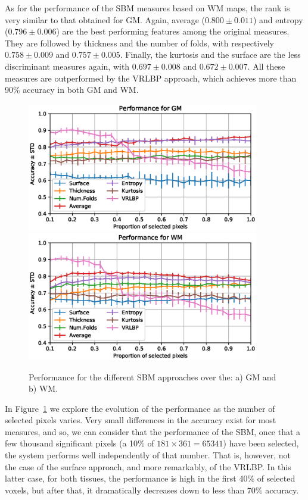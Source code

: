 As for the performance of the \ac{SBM} measures based on \ac{WM} maps, the rank is very similar to that obtained for \ac{GM}. Again, average ($0.800 \pm 0.011$) and entropy ($0.796 \pm 0.006$) are the best performing features among the original measures. They are followed by thickness and the number of folds, with respectively $0.758 \pm 0.009$ and $0.757 \pm 0.005$. Finally, the kurtosis and the surface are the less discriminant measures again, with $0.697 \pm 0.008$ and $0.672 \pm 0.007$. All these measures are outperformed by the \ac{VRLBP} approach, which achieves more than 90\% accuracy in both \ac{GM} and \ac{WM}. 

\begin{figure}[htp]
	\centering
	\includegraphics[width=0.9\textwidth]{Graphics/ch6/GMperformanceComp}\\
	\includegraphics[width=0.9\textwidth]{Graphics/ch6/WMperformanceComp}
	\caption{Performance for the different \ac{SBM} approaches over the: a) \acs{GM} and b) \acs{WM}.}
	\label{fig:figureGM}
\end{figure}

In Figure~\ref{fig:figureGM} we explore the evolution of the performance as the number of selected pixels varies. Very small differences in the accuracy exist for most measures, and so, we can consider that the performance of the \ac{SBM}, once that a few thousand significant pixels (a 10\% of $181\times361=65341$) have been selected, the system performs well independently of that number. That is, however, not the case of the surface approach, and more remarkably, of the \ac{VRLBP}. In this latter case, for both tissues, the performance is high in the first 40\% of selected voxels, but after that, it dramatically decreases down to less than 70\% accuracy. 

